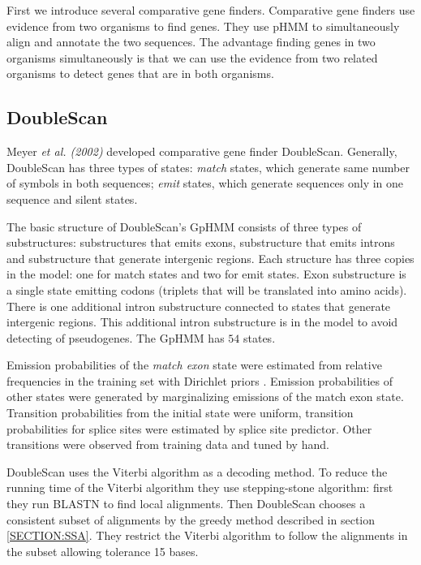 First we introduce several comparative gene finders. Comparative gene finders
use evidence from two organisms to find genes. They use pHMM to simultaneously
align and annotate the two sequences. The advantage finding genes in two
organisms simultaneously is that we can use the evidence from two related
organisms to detect genes that are in both organisms.

\subsection{DoubleScan}
Meyer {\it et al. (2002)} developed comparative gene finder DoubleScan.
Generally, DoubleScan has three types of states: {\it match} states, which
generate same number of symbols in both sequences;   {\it emit} states, which
generate sequences only in one sequence and silent states.  

The basic structure of DoubleScan's GpHMM consists of three types of
substructures: substructures that emits exons, substructure that emits introns
and substructure that generate intergenic regions. Each structure has three
copies in the model: one for match states and two for emit states. Exon
substructure is a single state emitting codons (triplets that will be translated
into amino acids).  There is one additional intron substructure connected to
states that generate intergenic regions. This additional intron substructure is
in the model to avoid detecting of pseudogenes. The GpHMM has $54$ states.

\nocite{Meyer2002}

Emission probabilities of the {\it match exon} state were estimated from
relative frequencies in the training set with Dirichlet priors
\cite{Meyer2002,Durbin1998}.  Emission probabilities of other states were
generated  by marginalizing emissions of the match exon state. Transition
probabilities from the initial state were uniform, transition probabilities for
splice sites were estimated by splice site predictor. Other transitions were
observed from training data and tuned by hand.

DoubleScan uses the Viterbi algorithm as a decoding method.  To reduce the
running time of the Viterbi algorithm they use stepping-stone algorithm: first
they run BLASTN to find local alignments. Then DoubleScan chooses a consistent
subset of alignments by the greedy method described in section
\ref{SECTION:SSA}. They restrict the Viterbi algorithm to follow the alignments
in the subset allowing tolerance 15 bases.

